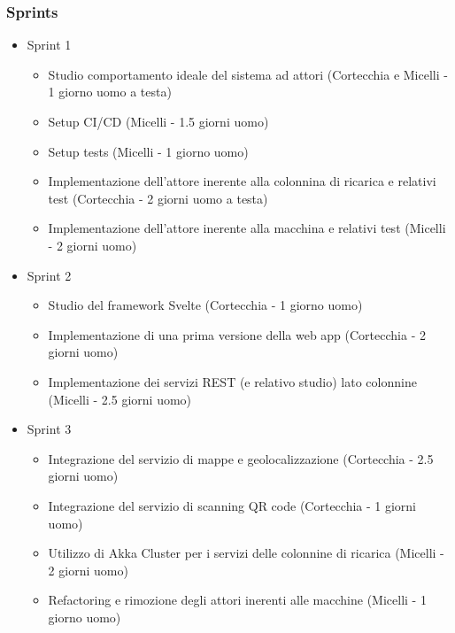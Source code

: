 \subsubsection{Sprints}

\begin{itemize}
    \item Sprint 1
          \begin{itemize}

              \item Studio comportamento ideale del sistema ad attori (Cortecchia e Micelli - 1 giorno uomo a testa)
              \item Setup CI/CD (Micelli - 1.5 giorni uomo)
              \item Setup tests (Micelli - 1 giorno uomo)
              \item Implementazione dell'attore inerente alla colonnina di ricarica e relativi test (Cortecchia - 2 giorni uomo a testa)
              \item Implementazione dell'attore inerente alla macchina e relativi test (Micelli - 2 giorni uomo)
          \end{itemize}

    \item Sprint 2
          \begin{itemize}
              \item Studio del framework Svelte (Cortecchia - 1 giorno uomo)
              \item Implementazione di una prima versione della web app (Cortecchia - 2 giorni uomo)
              \item Implementazione dei servizi REST (e relativo studio) lato colonnine (Micelli - 2.5 giorni uomo)
          \end{itemize}

    \item Sprint 3
          \begin{itemize}

              \item Integrazione del servizio di mappe e geolocalizzazione (Cortecchia - 2.5 giorni uomo)
              \item Integrazione del servizio di scanning QR code (Cortecchia - 1 giorni uomo)
              \item Utilizzo di Akka Cluster per i servizi delle colonnine di ricarica (Micelli - 2 giorni uomo)
              \item Refactoring e rimozione degli attori inerenti alle macchine (Micelli - 1 giorno uomo)


\end{itemize}
\end{itemize}
